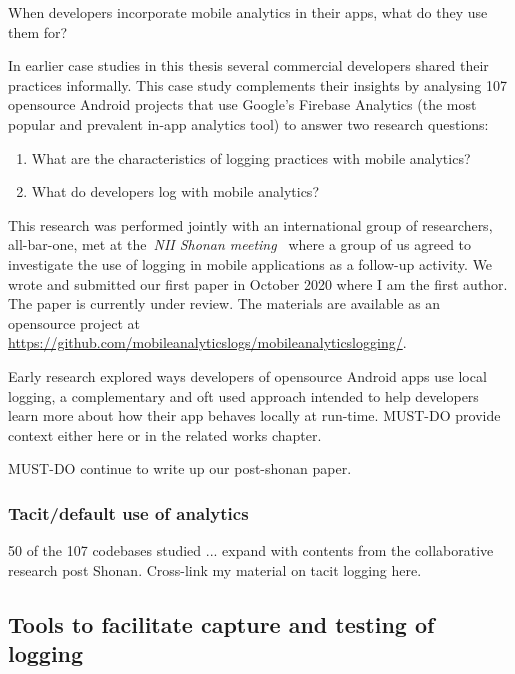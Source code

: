 When developers incorporate mobile analytics in their apps, what do they use them for? 

In earlier case studies in this thesis several commercial developers shared their practices informally. This case study complements their insights by analysing 107 opensource Android projects that use Google's Firebase Analytics (the most popular and prevalent in-app analytics tool) to answer two research questions:
\begin{enumerate}
    \item What are the characteristics of logging practices with mobile analytics?
    \item What do developers log with mobile analytics?
\end{enumerate}

This research was performed jointly with an international group of researchers, all-bar-one, met at the~\textit{NII Shonan meeting~\citep{nii_shonan_workshop_152}} where a group of us agreed to investigate the use of logging in mobile applications as a follow-up activity. We wrote and submitted our first paper in October 2020 where I am the first author. The paper is currently under review. The materials are available as an opensource project at \url{https://github.com/mobileanalyticslogs/mobileanalyticslogging/}.



Early research explored ways developers of opensource Android apps use local logging, a complementary and oft used approach intended to help developers learn more about how their app behaves locally at run-time. MUST-DO provide context either here or in the related works chapter.



MUST-DO continue to write up our post-shonan paper.



\subsubsection{Tacit/default use of analytics}
50 of the 107 codebases studied ... expand with contents from the collaborative research post Shonan. Cross-link my material on tacit logging here.

\subsection{Tools to facilitate capture and testing of logging}

